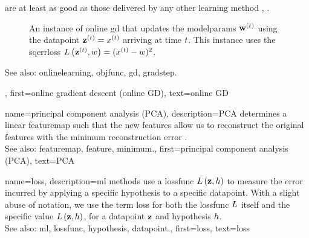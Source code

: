 {{		are at least as good as those delivered by any other learning method \cite{HazanOCO}, \cite{GDOptimalRakhlin2012}. 
\begin{figure}[H]
	\begin{center}
\end{center} 
\caption{An instance of online \gls{gd} that updates the \gls{modelparams} ${\bf w}^{(t)}$ 
using the \gls{datapoint} ${\bf z}^{(t)} = x^{(t)}$ arriving at time $t$. 
This instance uses the \gls{sqerrloss} $L\left({\bf z}^{(t)},w \right) = (x^{(t)} - w)^{2}$.}
\end{figure}
		See also: \gls{onlinelearning}, \gls{objfunc}, \gls{gd}, \gls{gradstep}.},
	first={online gradient descent (online GD)},
	text={online GD}
}

{name={principal component analysis (PCA)}, 
	description={PCA 
		determines a linear \gls{featuremap} such that the new \glspl{feature} 
		allow us to reconstruct the original \glspl{feature} with the \gls{minimum} reconstruction error \cite{MLBasics}.
				\\
		See also: \gls{featuremap}, \gls{feature}, \gls{minimum}.},
	first={principal component analysis (PCA)},
	text={PCA} 
}
	
{name={loss}, 
	description={\gls{ml} methods use a 
		\gls{lossfunc} $L\left({\bf z},h \right)$ to measure the error incurred 
		by applying a specific \gls{hypothesis} to a specific \gls{datapoint}. With a
		slight abuse of notation, we use the term loss for both the \gls{lossfunc} $L$ 
		itself and the specific value $L\left({\bf z},h \right)$, for a \gls{datapoint} ${\bf z}$ 
		and \gls{hypothesis} $h$.
				\\
		See also: \gls{ml}, \gls{lossfunc}, \gls{hypothesis}, \gls{datapoint}.},
	first={loss},
	text={loss} 
}

